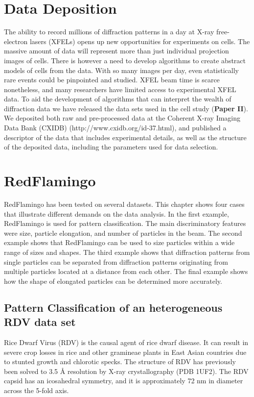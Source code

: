 \section{Data Deposition}
The ability to record millions of diffraction patterns in a day at X-ray free-electron lasers (XFELs) opens up new opportunities for experiments on cells. The massive amount of data will represent more than just individual projection images of cells. There is however a need to develop algorithms to create abstract models of cells from the data. With so many images per day, even statistically rare events could be pinpointed and studied. XFEL beam time is scarce nonetheless, and many researchers have limited access to experimental XFEL data. To aid the development of algorithms that can interpret the wealth of diffraction data we have released the data sets used in the cell study (\textbf{Paper II}). We deposited both raw and pre-processed data at the Coherent X-ray Imaging Data Bank (CXIDB) \cite{Maia2012a} (http://www.cxidb.org/id-37.html), and published a descriptor of the data that includes experimental details, as well as the structure of the deposited data, including the parameters used for data selection.

\section{RedFlamingo}

RedFlamingo has been tested on several datasets. This chapter shows four cases that illustrate different demands on the data analysis. In the first example, RedFlamingo is used for pattern classification. The main discriminatory features were size, particle elongation, and number of particles in the beam. The second example shows that RedFlamingo can be used to size particles within a wide range of sizes and shapes. The third example shows that diffraction patterns from single particles can be separated from diffraction patterns originating from multiple particles located at a distance from each other. The final example shows how the shape of elongated particles can be determined more accurately. 

\subsection{Pattern Classification of an heterogeneous RDV data set}
Rice Dwarf Virus (RDV) is the causal agent of rice dwarf disease. It can result in severe crop losses in rice and other gramineae plants in East Asian countries due to stunted growth and chlorotic specks. The structure of RDV has previously been solved to 3.5 {\AA} resolution by X-ray crystallography \cite{Nakagawa2003} (PDB 1UF2). The RDV capsid has an icosahedral symmetry, and it is approximately 72 nm in diameter across the 5-fold axis.

